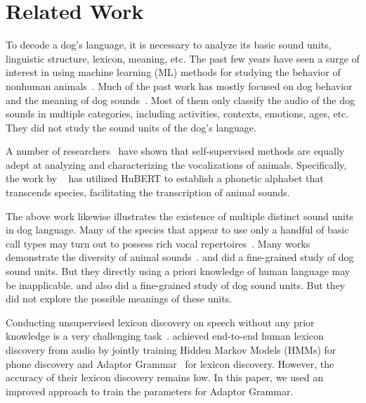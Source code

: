 \section{Related Work}

To decode a dog's language, it is necessary to analyze its basic sound units, linguistic structure, lexicon, meaning, etc. 
The past few years have seen a surge of interest in using machine learning (ML) methods for studying the behavior of nonhuman animals~\citep{rutz2023using}. 
Much of the past work has mostly focused on dog behavior~\citep{abzaliev2024towards, ide2021rescue,ehsani2018let} and the meaning of dog sounds~\citep{molnar2008classification,hantke2018my,larranaga2015comparing,hantke2018my,pongracz2006acoustic}. 
Most of them only classify the audio of the dog sounds in multiple categories, including activities, contexts, emotions, ages, etc. They did not study the sound units of the dog's language.

A number of researchers~\citep{hagiwara2023aves, abzaliev2024towards} have shown that self-supervised methods are equally adept at analyzing and characterizing the vocalizations of animals. Specifically, the work by ~ has utilized HuBERT to establish a phonetic alphabet that transcends species, facilitating the transcription of animal sounds.


The above work likewise illustrates the existence of multiple distinct sound units in dog language. Many of the species that appear to use only a handful of basic call types may turn out to possess rich vocal repertoires~\citep{rutz2023using}. Many works demonstrate the diversity of animal sounds~\citep{paladini2020bark,robbins2000vocal,bermant2019deep}. \citet{huang2023transcribing} and \citet{wang2023towards} did a fine-grained study of dog sound units. But they directly using a priori knowledge of human language may be inapplicable. \citet{hagiwara2024ispa}
and \citet{hagiwara2023aves} also did a fine-grained study of dog sound units. 
But they did not explore the possible meanings of these units.

Conducting unsupervised lexicon discovery on speech without any prior knowledge is 
a very challenging task~\citep{park2007unsupervised}.
\citet{lee2015unsupervised} achieved end-to-end human lexicon discovery from audio by 
jointly training Hidden Markov Models (HMMs)\citep{schwartz1984improved} for phone discovery
and Adaptor Grammar~\citep{johnson2006adaptor} for lexicon discovery.
However, the accuracy of their lexicon discovery remains low. In this paper, we used an 
improved approach to train the parameters for Adaptor Grammar.

